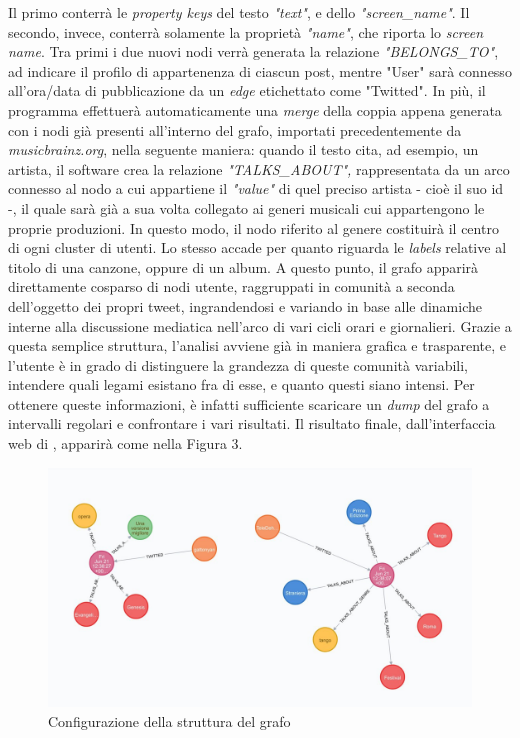 \documentclass[12pt, a4paper, twocolumn]{article} %
\begin{document}
Il primo conterrà le \textit{property keys} del testo \textit{"text"}, e dello \textit{"screen\_name"}. 
Il secondo, invece, conterrà solamente la proprietà \textit{"name"}, che riporta lo \textit{screen name}. 
Tra primi i due nuovi nodi verrà generata la relazione \textit{"BELONGS\_TO"}, ad indicare il profilo di appartenenza di ciascun post, mentre "User" sarà connesso all'ora/data di pubblicazione da un \textit{edge} etichettato come "Twitted".
In più, il programma effettuerà automaticamente una \textit{merge} della coppia appena generata con i nodi già presenti all'interno del grafo, importati precedentemente da \textit{musicbrainz.org}, nella seguente maniera: quando il testo cita, ad esempio, un artista, il software crea la relazione \textit{"TALKS\_ABOUT",} rappresentata da un arco connesso al nodo a cui appartiene il \textit{"value"} di quel preciso artista - cioè il suo id -, il quale sarà già a sua volta collegato ai generi musicali cui appartengono le proprie produzioni. In questo modo, il nodo riferito al genere costituirà il centro di ogni cluster di utenti. 
Lo stesso accade per quanto riguarda le \textit{labels} relative al titolo di una canzone, oppure di un album. 
A questo punto, il grafo apparirà direttamente cosparso di nodi utente, raggruppati in comunità a seconda dell'oggetto dei propri tweet, ingrandendosi e variando in base alle dinamiche interne alla discussione mediatica nell'arco di vari cicli orari e giornalieri. 
Grazie a questa semplice struttura, l'analisi avviene già in maniera grafica e trasparente, e l'utente è in grado di distinguere la grandezza di queste comunità variabili, intendere quali legami esistano fra di esse, e quanto questi siano intensi.
Per ottenere queste informazioni, è infatti sufficiente scaricare un \textit{dump} del grafo a intervalli regolari e confrontare i vari risultati. 
Il risultato finale, dall'interfaccia web di , apparirà come nella Figura 3.

\begin{figure}
	\centering
	\includegraphics{small_graph.png}
	\caption{Configurazione della struttura del grafo}
\end{figure}
\end{document}
